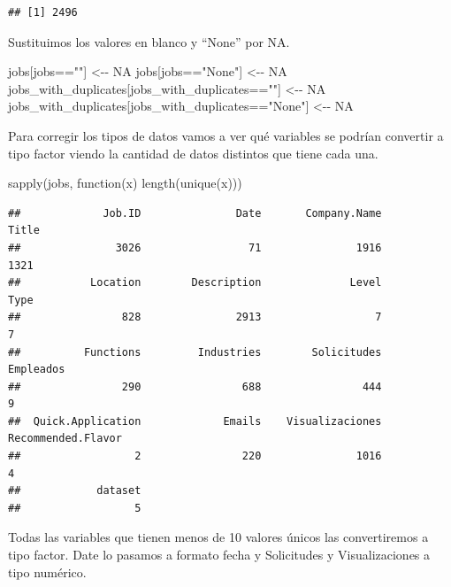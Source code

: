 \documentclass[
]{article}
\newenvironment{Shaded}{\begin{snugshade}}{\end{snugshade}}
\newcommand{\ControlFlowTok}[1]{\textcolor[rgb]{0.94,0.87,0.69}{#1}}
\newcommand{\KeywordTok}[1]{\textcolor[rgb]{0.94,0.87,0.69}{#1}}
\newcommand{\NormalTok}[1]{\textcolor[rgb]{0.80,0.80,0.80}{#1}}
\newcommand{\OperatorTok}[1]{\textcolor[rgb]{0.94,0.94,0.82}{#1}}
\newcommand{\OtherTok}[1]{\textcolor[rgb]{0.94,0.94,0.56}{#1}}
\newcommand{\StringTok}[1]{\textcolor[rgb]{0.80,0.58,0.58}{#1}}
\begin{document}
\begin{verbatim}
## [1] 2496
\end{verbatim}

Sustituimos los valores en blanco y ``None'' por NA.

\begin{Shaded}
\begin{Highlighting}[]
\NormalTok{jobs[jobs}\OperatorTok{==}\StringTok{""}\NormalTok{] \textless{}{-}}\OperatorTok{{-}}\StringTok{ }\OtherTok{NA}
\NormalTok{jobs[jobs}\OperatorTok{==}\StringTok{"None"}\NormalTok{] \textless{}{-}}\OperatorTok{{-}}\StringTok{ }\OtherTok{NA}
\NormalTok{jobs\_with\_duplicates[jobs\_with\_duplicates}\OperatorTok{==}\StringTok{""}\NormalTok{] \textless{}{-}}\OperatorTok{{-}}\StringTok{ }\OtherTok{NA}
\NormalTok{jobs\_with\_duplicates[jobs\_with\_duplicates}\OperatorTok{==}\StringTok{"None"}\NormalTok{] \textless{}{-}}\OperatorTok{{-}}\StringTok{ }\OtherTok{NA}
\end{Highlighting}
\end{Shaded}

Para corregir los tipos de datos vamos a ver qué variables se podrían
convertir a tipo factor viendo la cantidad de datos distintos que tiene
cada una.

\begin{Shaded}
\begin{Highlighting}[]
\KeywordTok{sapply}\NormalTok{(jobs, }\ControlFlowTok{function}\NormalTok{(x) }\KeywordTok{length}\NormalTok{(}\KeywordTok{unique}\NormalTok{(x)))}
\end{Highlighting}
\end{Shaded}

\begin{verbatim}
##             Job.ID               Date       Company.Name              Title 
##               3026                 71               1916               1321 
##           Location        Description              Level               Type 
##                828               2913                  7                  7 
##          Functions         Industries        Solicitudes          Empleados 
##                290                688                444                  9 
##  Quick.Application             Emails    Visualizaciones Recommended.Flavor 
##                  2                220               1016                  4 
##            dataset 
##                  5
\end{verbatim}

Todas las variables que tienen menos de 10 valores únicos las
convertiremos a tipo factor. Date lo pasamos a formato fecha y
Solicitudes y Visualizaciones a tipo numérico.
\end{document}
